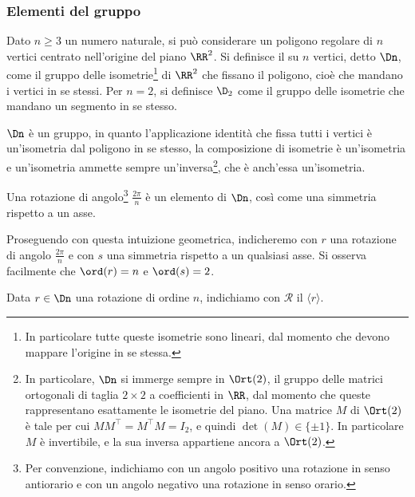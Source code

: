 \documentclass[11pt]{scrartcl}
\begin{document}
	\subsubsection{Elementi del gruppo}
	
	\begin{definition}
		Dato $n \geq 3$ un numero naturale, si può considerare un poligono regolare di $n$ vertici centrato nell'origine del piano $\RR^2$. Si definisce il
		 su $n$ vertici, detto $\Dn$, come il gruppo
		delle isometrie\footnote{
			In particolare tutte queste isometrie sono lineari, dal momento che
			devono mappare l'origine in se stessa.
		} di $\RR^2$ che fissano il poligono, cioè che mandano i 
		vertici in se stessi. Per $n = 2$, si definisce $\D_2$ come il gruppo delle
		isometrie che mandano un segmento in se stesso.
	\end{definition}
	
	\begin{remark}
		$\Dn$ è un gruppo, in quanto l'applicazione identità che 
		fissa tutti i vertici è un'isometria dal poligono in se stesso, la 
		composizione di isometrie è un'isometria e un'isometria ammette sempre 
		un'inversa\footnote{
			In particolare, $\Dn$ si immerge sempre in $\Ort(2)$, il gruppo delle matrici ortogonali
			di taglia $2 \times 2$ a coefficienti in $\RR$, dal momento che queste rappresentano esattamente le
			isometrie del piano. Una matrice $M$ di $\Ort(2)$ è tale per cui $M M^\top = M^\top M = I_2$, e quindi $\det(M) \in \{\pm 1\}$. In particolare $M$ è invertibile, e la
			sua inversa appartiene ancora a $\Ort(2)$.
		}, che è anch'essa un'isometria.
	\end{remark}
	
	\begin{remark}
		Una rotazione di angolo\footnote{
			Per convenzione, indichiamo con un angolo positivo una rotazione in senso antiorario e con un angolo negativo una rotazione in senso orario.
		} $\frac{2\pi}{n}$ è un elemento di $\Dn$,
		così come una simmetria rispetto a un asse.
	\end{remark}
	
	Proseguendo con questa intuizione geometrica, indicheremo con $r$ una rotazione
	di angolo $\frac{2\pi}{n}$ e con $s$ una simmetria rispetto a
	un qualsiasi asse. Si osserva facilmente che $\ord(r) = n$ e $\ord(s) = 2$.
	
	\begin{definition}
		Data $r \in \Dn$ una rotazione di ordine $n$, indichiamo con $\mathcal{R}$ il
		 $\langle r\rangle$.
	\end{definition}
	
\end{document}
